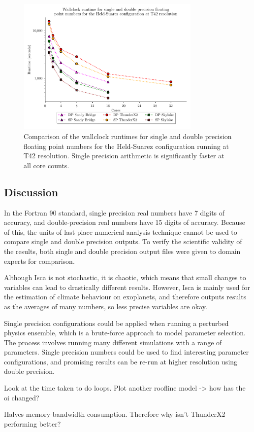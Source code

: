 \documentclass[a4paper,11pt]{report}
\begin{document}
\begin{figure}[htbp]
\begin{center}
\includegraphics[width=0.8\textwidth]{img/single-double-precision.pdf}
\caption[Performance comparison of varied precision of floating point numbers]{Comparison of the wallclock runtimes for single and double precision floating point numbers for the Held-Suarez configuration running at T42 resolution. Single precision arithmetic is significantly faster at all core counts. }
\label{fig:precision}
\end{center}
\end{figure}
 
\subsection{Discussion}
In the Fortran 90 standard, single precision real numbers have 7 digits of accuracy, and double-precision real numbers have 15 digits of accuracy. Because of this, the units of last place numerical analysis technique cannot be used to compare single and double precision outputs. To verify the scientific validity of the results, both single and double precision output files were given to domain experts for comparison. 
\par
Although Isca is not stochastic, it is chaotic, which means that small changes to variables can lead to drastically different results. However, Isca is mainly used for the estimation of climate behaviour on exoplanets, and therefore outputs results as the averages of many numbers, so less precise variables are okay. 
\par
Single precision configurations could be applied when running a perturbed physics ensemble, which is a brute-force approach to model parameter selection. The process involves running many different simulations with a range of parameters. Single precision numbers could be used to find interesting parameter configurations, and promising results can be re-run at higher resolution using double precision.
\par
Look at the time taken to do loops. Plot another roofline model -> how has the oi changed? 
\par
Halves memory-bandwidth consumption. Therefore why isn't ThunderX2 performing better? 
\end{document}
